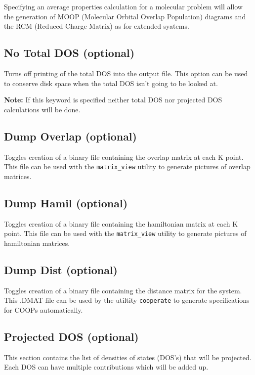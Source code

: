 Specifying an average properties calculation for a molecular problem
will allow the generation of MOOP (Molecular Orbital Overlap
Population) diagrams and the RCM (Reduced Charge Matrix) as for
extended syatems.

\subsection{{\sf No Total DOS} (optional)}

Turns off printing of the total DOS into the output file.  This option
can be used to conserve disk space when the total DOS isn't going to
be looked at.  

{\bf Note:}  If this keyword is specified neither total DOS nor
projected DOS calculations will be done.


\subsection{{\sf Dump Overlap} (optional)}

Toggles creation of a binary file containing the overlap matrix at
each K point.  This file can be used with the {\tt matrix\_view} utility to
generate pictures of overlap matrices.

\subsection{{\sf Dump Hamil} (optional)}

Toggles creation of a binary file containing the hamiltonian matrix at
each K point.  This file can be used with the {\tt matrix\_view} utility to
generate pictures of hamiltonian matrices.

\subsection{{\sf Dump Dist} (optional)}

Toggles creation of a binary file containing the distance matrix
for the system.  This .DMAT file can be used by the utiltity
{\tt cooperate} to generate specifications for COOPs automatically.


\subsection{{\sf Projected DOS} (optional)}

This section contains the list of densities of states (DOS's) that
will be projected.  Each DOS can have multiple contributions which
will be added up.

